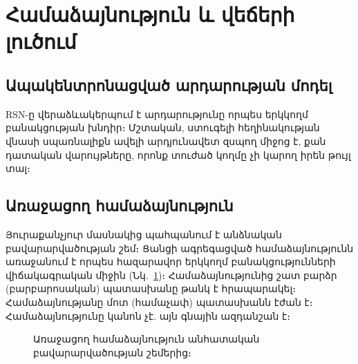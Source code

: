 \documentclass[11pt,a4paper,twocolumn]{article}
\begin{document}
\section{Համաձայնություն և վեճերի լուծում}

\subsection{Ապակենտրոնացված արդարության մոդել}

RSN-ը վերաձևակերպում է արդարությունը որպես երկկողմ բանակցության խնդիր։ Մշտական, ստուգելի հեղինակության վնասի սպառնալիքն ավելի արդյունավետ զսպող միջոց է, քան դատական վարույթները, որոնք տուժած կողմը չի կարող իրեն թույլ տալ։

\subsection{Առաջացող համաձայնություն}

Յուրաքանչյուր մասնակից պահպանում է անձնական բավարարվածության շեմ։ Ցանցի ագրեգացված համաձայնությունն առաջանում է որպես հազարավոր երկկողմ բանակցությունների վիճակագրական միջին (Նկ.~\ref{fig:consensus})։ Համաձայնությունից շատ բարձր (բարբարոսական) պատասխանը թանկ է հրապարակել։ Համաձայնությանը մոտ (համաչափ) պատասխանն էժան է։ Համաձայնությունը կանոն չէ. այն գնային ազդանշան է։

\begin{figure}[ht]
\centering
{}
\caption{Առաջացող համաձայնություն անհատական բավարարվածության շեմերից։}
\label{fig:consensus}
\end{figure}
\end{document}
